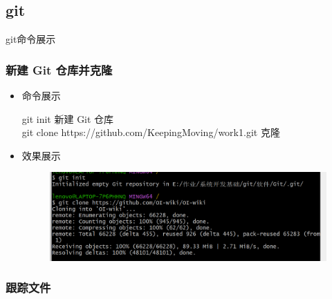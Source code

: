 \documentclass[UTF8]{ctexart}
\begin{document}
  \subsection{git}
  {\color{blue}git命令展示}




\subsubsection{新建 Git 仓库并克隆}

  \begin{itemize} 
  
      \item 命令展示

git init 新建 Git 仓库\\
git clone https://github.com/KeepingMoving/work1.git 克隆
   \item 效果展示

\begin{figure}[H]
\includegraphics[width=1\textwidth]{a}
\end{figure}

\end{itemize}


\subsubsection{跟踪文件}
\end{document}
